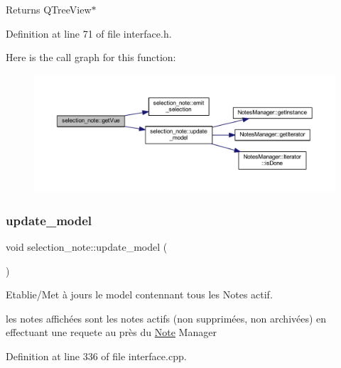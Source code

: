 \begin{DoxyReturn}{Returns}
Q\+Tree\+View$\ast$ 
\end{DoxyReturn}


Definition at line 71 of file interface.\+h.

Here is the call graph for this function\+:\nopagebreak
\begin{figure}[H]
\begin{center}
\leavevmode
\includegraphics[width=350pt]{classselection__note_a8ebca9b8b266b7891b807a5f1af3cf2b_cgraph}
\end{center}
\end{figure}
\mbox{\label{classselection__note_aab004424eba4264628d2e01108f2e63b}} 
\subsubsection{\texorpdfstring{update\+\_\+model}{update\_model}}
{\footnotesize\ttfamily void selection\+\_\+note\+::update\+\_\+model (\begin{DoxyParamCaption}{ }\end{DoxyParamCaption})\hspace{0.3cm}{\ttfamily [slot]}}



Etablie/\+Met à jours le model contennant tous les Notes actif. 

les notes affichées sont les notes actifs (non supprimées, non archivées) en effectuant une requete au près du \hyperlink{class_note}{Note} Manager 

Definition at line 336 of file interface.\+cpp.

